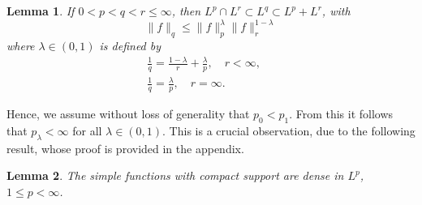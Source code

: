 \documentclass[12pt,reqno]{amsart}
\numberwithin{equation}{section}  %
\numberwithin{figure}{section}
\theoremstyle{plain}
\newtheorem{lemma}{Lemma}
\theoremstyle{definition}
\theoremstyle{remark}
\begin{document}
%
%
%
%
\begin{lemma}
\label{lem:simp-riesz-thorin}
If $0 < p < q < r \le \infty$, then $L^{p} \cap L^{r} \subset L^{q} \subset
L^{p} + L^{r}$, with
%
%
\begin{equation}
\label{embed-relation}
\| f \|_{q} \le \| f \|_{p}^{\lambda} \| f \|_{r}^{1-\lambda}
\end{equation}
%
%
where $\lambda \in (0,1)$ is defined by
%
%
\begin{align}
\label{embed-param-fin}
& \frac{1}{q} = \frac{1-\lambda}{r} + \frac{\lambda}{p}, \quad r < \infty, \qquad
\\
\label{embed-param-infty}
& \frac{1}{q} = \frac{\lambda}{p}, \quad r = \infty.
\end{align}
%
%
\end{lemma}
%
%
Hence, we assume without loss of generality that $p_0 < p_1$. From this it
follows that $p_\lambda < \infty$ for all $\lambda \in (0,1)$. This is a crucial
observation, due to the following result, whose proof is provided in the
appendix.
%
%
%
%
%
%
%
%
%
%
\begin{lemma}
\label{lem:simp-func}
The simple functions with compact support are dense in $L^{p}$, $1 \le p <
\infty$.
\end{lemma}
%
%
\end{document}
